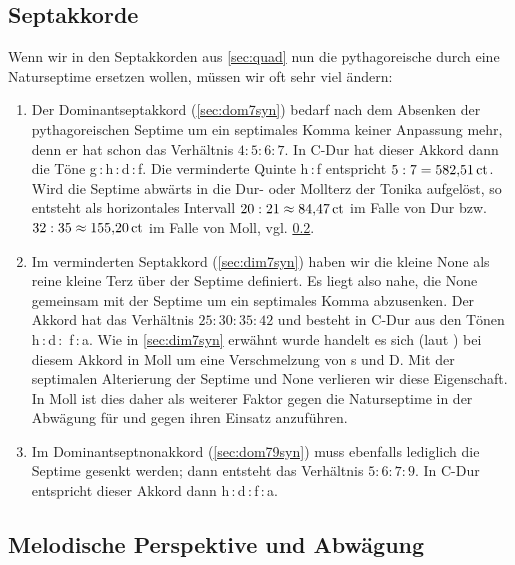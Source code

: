 \subsection{Septakkorde}

Wenn wir in den Septakkorden aus \cref{sec:quad} nun die pythagoreische durch
eine Naturseptime ersetzen wollen, müssen wir oft sehr viel ändern:

\begin{enumerate}
\item Der Dominantseptakkord (\cref{sec:dom7syn}) bedarf nach dem Absenken der
  pythagoreischen Septime um ein septimales Komma keiner Anpassung mehr, denn er
  hat schon das Verhältnis $4:5:6:7$. In C-Dur hat dieser Akkord dann die Töne
  g\,:\,\naturalm h\,:\,d\,:\,\septimal f.  Die verminderte Quinte \naturalm
  h\,:\,\septimal f entspricht $5:7 = 582{,}51\,\text{ct}$.  Wird die Septime abwärts in
  die Dur- oder Mollterz der Tonika aufgelöst, so entsteht als horizontales
  Intervall $20:21\approx 84{,}47\,\text{ct}$ im Falle von Dur bzw.
  $32:35\approx 155{,}20\,\text{ct}$ im Falle von Moll,
  vgl. \cref{sec:septmel}.
\item{} Im verminderten Septakkord
  (\cref{sec:dim7syn}) haben wir die kleine None als reine kleine Terz über der
  Septime definiert. Es liegt also nahe, die None gemeinsam mit der Septime um
  ein septimales Komma abzusenken. Der Akkord hat das Verhältnis $25:30:35:42$
  und besteht in C-Dur aus den Tönen \naturalm h\,:\,d\,:\,\septimal
  f\,:\,\septimal\flatp a. Wie in \cref{sec:dim7syn} erwähnt wurde handelt es
  sich (laut \cite[S.\,92ff.]{deLaMotte}) bei diesem Akkord in Moll um eine
  Verschmelzung von s und D. Mit der septimalen Alterierung der Septime und None
  verlieren wir diese Eigenschaft. In Moll ist dies daher als weiterer Faktor
  gegen die Naturseptime in der Abwägung für und gegen ihren Einsatz anzuführen.
\item Im Dominantseptnonakkord (\cref{sec:dom79syn}) muss ebenfalls lediglich
  die Septime gesenkt werden; dann entsteht das Verhältnis $5:6:7:9$. In C-Dur
  entspricht dieser Akkord dann \naturalm h\,:\,d\,:\,\septimal f\,:\,a.
\end{enumerate}

\subsection{Melodische Perspektive und Abwägung}
\label{sec:septmel}

